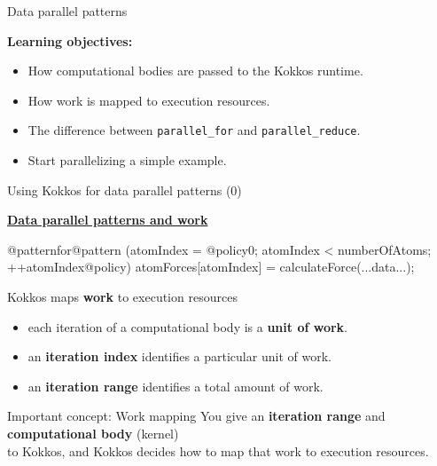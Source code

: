 
\begin{frame}[fragile]{}

  {\Huge Data parallel patterns}

  \vspace{20pt}

  \textbf{Learning objectives:}
  \begin{itemize}
    \item{How computational bodies are passed to the Kokkos runtime.}
    \item{How work is mapped to execution resources.}
    \item{The difference between \texttt{parallel\_for} and \texttt{parallel\_reduce}.}
    \item{Start parallelizing a simple example.}
  \end{itemize}

  \vspace{-20pt}

\end{frame}


\begin{frame}[fragile]{Using Kokkos for data parallel patterns (0)}

  \textbf{\ul{Data parallel patterns and work}}

  \begin{code}[linebackgroundcolor={
        \btLstHL<1->{2}{bodyColor}
      }
    ]
@patternfor@pattern (atomIndex = @policy0; atomIndex < numberOfAtoms; ++atomIndex@policy) {
  atomForces[atomIndex] = calculateForce(...data...);
}
  \end{code}

  Kokkos maps \textbf{work} to execution resources

  \pause

  \begin{itemize}
    \item {each iteration of a computational body is a \textbf{unit of work}.}
    \item {an \textbf{iteration index} identifies a particular unit of work.}
    \item {an \textbf{iteration range} identifies a total amount of work.}
  \end{itemize}

  \pause

  \vspace{0pt}

  \begin{block}{Important concept: Work mapping}
    You give an \textbf{iteration range} and \textbf{computational body} (kernel) \\
    to Kokkos, and Kokkos decides how to map that work to execution resources.
  \end{block}

  \vspace{-10pt}

\end{frame}


